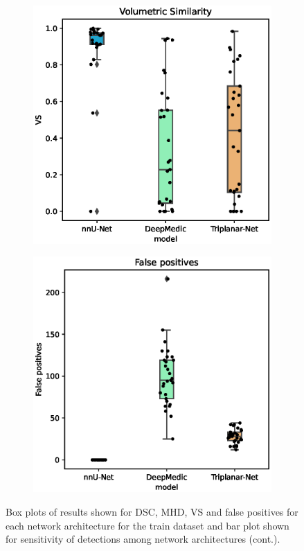 \begin{figure}
	\ContinuedFloat
	\centering
	\begin{subfigure}{.6\linewidth}
		\includegraphics[width=\linewidth]{figures/VS.eps}
	\end{subfigure}
	\begin{subfigure}{.6\linewidth}
		\includegraphics[width=\linewidth]{figures/FalsePositives.eps}
	\end{subfigure}
	\caption{Box plots of results shown for DSC, MHD, VS and false positives for each network architecture for the train dataset and bar plot shown for sensitivity of detections among network architectures (cont.).}
	\label{fig:results_cont}
\end{figure}
